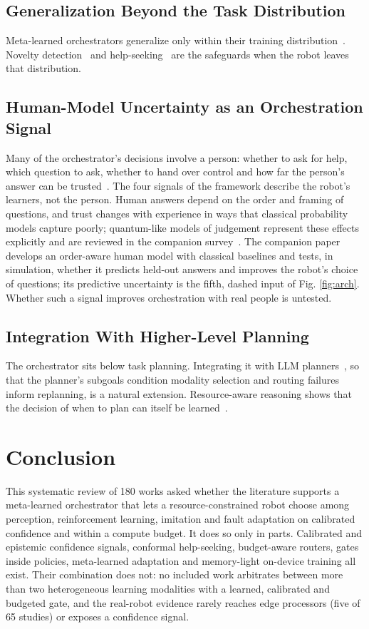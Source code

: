 \documentclass[journal]{IEEEtran}
\begin{document}
\subsection{Generalization Beyond the Task Distribution}\label{sec:ch-general}
Meta-learned orchestrators generalize only within their training distribution~\cite{Yu2019}. Novelty detection~\cite{Burda2019,Hendrycks2017} and help-seeking~\cite{Ren2023,Yuan2026} are the safeguards when the robot leaves that distribution.


\subsection{Human-Model Uncertainty as an Orchestration Signal}\label{sec:ch-human}
Many of the orchestrator's decisions involve a person: whether to ask for help, which question to ask, whether to hand over control and how far the person's answer can be trusted~\cite{Ren2023,Hoque2021,Yuan2026}. The four signals of the framework describe the robot's learners, not the person. Human answers depend on the order and framing of questions, and trust changes with experience in ways that classical probability models capture poorly; quantum-like models of judgement represent these effects explicitly and are reviewed in the companion survey~\cite{Guru2026b}. The companion paper~\cite{Guru2026c} develops an order-aware human model with classical baselines and tests, in simulation, whether it predicts held-out answers and improves the robot's choice of questions; its predictive uncertainty is the fifth, dashed input of Fig. \ref{fig:arch}. Whether such a signal improves orchestration with real people is untested.


\subsection{Integration With Higher-Level Planning}\label{sec:ch-plan}
The orchestrator sits below task planning. Integrating it with LLM planners~\cite{Ahn2022,Huang2022b}, so that the planner's subgoals condition modality selection and routing failures inform replanning, is a natural extension. Resource-aware reasoning shows that the decision of when to plan can itself be learned~\cite{Liu2026}.


\section{Conclusion}\label{sec:conclusion}
This systematic review of 180 works asked whether the literature supports a meta-learned orchestrator that lets a resource-constrained robot choose among perception, reinforcement learning, imitation and fault adaptation on calibrated confidence and within a compute budget. It does so only in parts. Calibrated and epistemic confidence signals, conformal help-seeking, budget-aware routers, gates inside policies, meta-learned adaptation and memory-light on-device training all exist. Their combination does not: no included work arbitrates between more than two heterogeneous learning modalities with a learned, calibrated and budgeted gate, and the real-robot evidence rarely reaches edge processors (five of 65 studies) or exposes a confidence signal.
\end{document}
